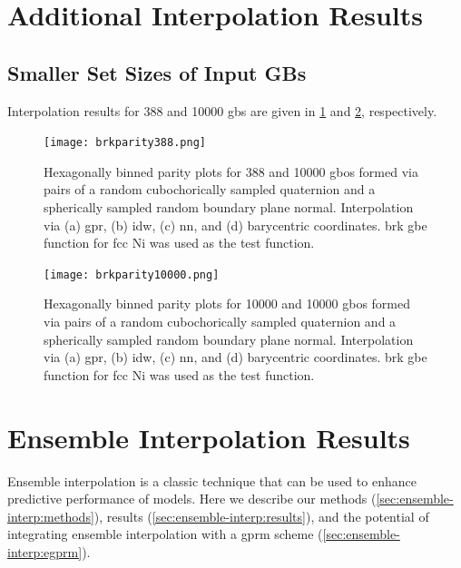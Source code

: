 \documentclass[preprint,12pt]{elsarticle}
\begin{document}
\section{Additional Interpolation Results}

\subsection{Smaller Set Sizes of Input GBs}
Interpolation results for \num{388} and \num{10000} \glspl{gb} are given in \cref{fig:brkparity388} and \cref{fig:brkparity10000}, respectively.

\begin{figure}[!ht]
    \centering
    \texttt{[image: brkparity388.png]}
    \caption{Hexagonally binned parity plots for \num{388} \inpt{} and \num{10000} \outpt{} \glspl{gbo} formed via pairs of a random cubochorically sampled quaternion and a spherically sampled random boundary plane normal. Interpolation via (a) \gls{gpr}, (b) \gls{idw}, (c) \gls{nn}, and (d) barycentric coordinates.  \gls{brk} \gls{gbe} function for \gls{fcc} Ni \cite{bulatovGrainBoundaryEnergy2014} was used as the test function.}
    \label{fig:brkparity388}
\end{figure}

\begin{figure}[!ht]
    \centering
    \texttt{[image: brkparity10000.png]}
    \caption{Hexagonally binned parity plots for \num{10000} \inpt{} and \num{10000} \outpt{} \glspl{gbo} formed via pairs of a random cubochorically sampled quaternion and a spherically sampled random boundary plane normal. Interpolation via (a) \gls{gpr}, (b) \gls{idw}, (c) \gls{nn}, and (d) barycentric coordinates.  \gls{brk} \gls{gbe} function for \gls{fcc} Ni \cite{bulatovGrainBoundaryEnergy2014} was used as the test function.}
    \label{fig:brkparity10000}
\end{figure}

\section{Ensemble Interpolation Results}
\label{sec:ensemble-interp}
Ensemble interpolation is a classic technique that can be used to enhance predictive performance of models. Here we describe our methods (\cref{sec:ensemble-interp:methods}), results (\cref{sec:ensemble-interp:results}), and the potential of integrating ensemble interpolation with a \gls{gprm} scheme (\cref{sec:ensemble-interp:egprm}).
\end{document}

